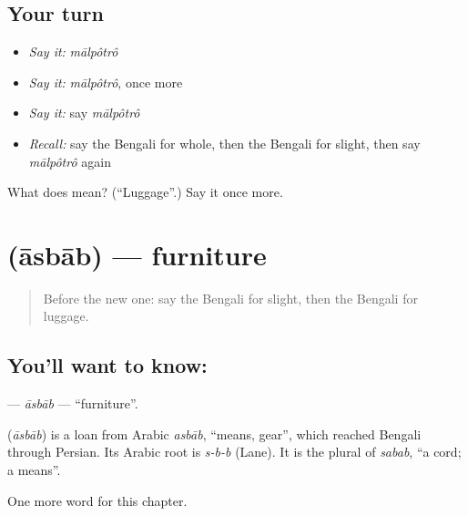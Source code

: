 \subsection*{Your turn}
\begin{itemize}
\raggedright
  \item \emph{Say it:} \emph{mālpôtrô}
  \item \emph{Say it:} \emph{mālpôtrô}, once more
  \item \emph{Say it:} say \emph{mālpôtrô}
  \item \emph{Recall:} say the Bengali for whole, then the Bengali for slight, then say \emph{mālpôtrô} again
\end{itemize}

\begin{tcolorbox}[breakable,colback=teal!4,colframe=teal!35!black,title={Before you move on}]
What does  mean? (\textquotedblleft{}Luggage\textquotedblright{}.) Say it once more.
\end{tcolorbox}
\section[\texorpdfstring{\bn{আসবাব} (āsbāb)}{আসবাব (āsbāb)}]{ (āsbāb) — furniture}

\label{lesson:BN-C163-asbab}



\begin{quote}
Before the new one: say the Bengali for slight, then the Bengali for luggage.
\end{quote}

\subsection*{You'll want to know: }
\textbf{} — \emph{āsbāb} — \textquotedblleft{}furniture\textquotedblright{}.

\begin{cousinweb}
\textbf{} (\emph{āsbāb}) is a loan from Arabic \emph{asbāb}, \textquotedblleft{}means, gear\textquotedblright{}, which reached Bengali through Persian. Its Arabic root is \emph{s-b-b} (Lane). It is the plural of \emph{sabab}, \textquotedblleft{}a cord; a means\textquotedblright{}.
\end{cousinweb}

\begin{grammarlens}[title={What you've built}]
One more word for this chapter.
\end{grammarlens}

